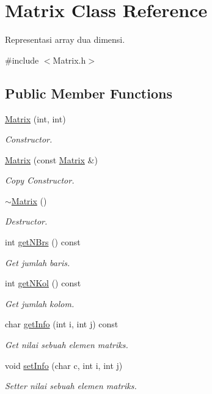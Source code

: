 \hypertarget{class_matrix}{}\section{Matrix Class Reference}
\label{class_matrix}


Representasi array dua dimensi.  




{\ttfamily \#include $<$Matrix.\+h$>$}

\subsection*{Public Member Functions}
\begin{DoxyCompactItemize}
\item 
\hyperlink{class_matrix_adfbeb67cc3c43d96c53f881d79f919cb}{Matrix} (int, int)
\begin{DoxyCompactList}\small\item\em Constructor. \end{DoxyCompactList}\item 
\hyperlink{class_matrix_a0b9cfa2302a0273afb1b26e501f93abc}{Matrix} (const \hyperlink{class_matrix}{Matrix} \&)
\begin{DoxyCompactList}\small\item\em Copy Constructor. \end{DoxyCompactList}\item 
\hyperlink{class_matrix_a9b1c3627f573d78a2f08623fdfef990f}{$\sim$\+Matrix} ()
\begin{DoxyCompactList}\small\item\em Destructor. \end{DoxyCompactList}\item 
int \hyperlink{class_matrix_a518609c744a502753d79063d75075312}{get\+N\+Brs} () const 
\begin{DoxyCompactList}\small\item\em Get jumlah baris. \end{DoxyCompactList}\item 
int \hyperlink{class_matrix_a9d540e5e85c41e7852308b1000a04ecd}{get\+N\+Kol} () const 
\begin{DoxyCompactList}\small\item\em Get jumlah kolom. \end{DoxyCompactList}\item 
char \hyperlink{class_matrix_a58e92d242a032a24ebbbfb235093edd9}{get\+Info} (int i, int j) const 
\begin{DoxyCompactList}\small\item\em Get nilai sebuah elemen matriks. \end{DoxyCompactList}\item 
void \hyperlink{class_matrix_adf43d84e79f4d48bdd087c3af5099a0b}{set\+Info} (char c, int i, int j)
\begin{DoxyCompactList}\small\item\em Setter nilai sebuah elemen matriks. \end{DoxyCompactList}\end{DoxyCompactItemize}


